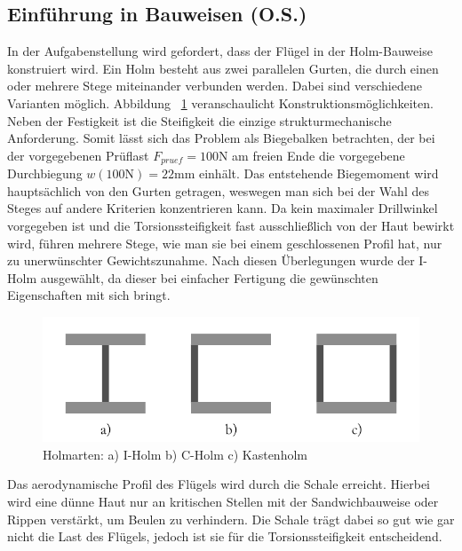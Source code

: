 \newpage
\subsection{Einführung in Bauweisen (O.S.)}
In der Aufgabenstellung wird gefordert, dass der Flügel in der Holm-Bauweise konstruiert wird. Ein Holm besteht aus zwei parallelen Gurten, die durch einen oder mehrere Stege miteinander verbunden werden. Dabei sind verschiedene Varianten möglich. Abbildung ~\ref{fig: Holmarten} veranschaulicht Konstruktionsmöglichkeiten. Neben der Festigkeit ist die Steifigkeit die einzige strukturmechanische Anforderung. Somit lässt sich das Problem als Biegebalken betrachten, der bei der vorgegebenen Prüflast $ F_{pruef}=100\mathrm{N} $ am freien Ende die vorgegebene Durchbiegung $ w(100\mathrm{N})=22\mathrm{mm} $ einhält. Das entstehende Biegemoment wird hauptsächlich von den Gurten getragen, weswegen man sich bei der Wahl des Steges auf andere Kriterien konzentrieren kann. Da kein maximaler Drillwinkel vorgegeben ist und die Torsionssteifigkeit fast ausschließlich von der Haut bewirkt wird, führen mehrere Stege, wie man sie bei einem geschlossenen Profil hat, nur zu unerwünschter Gewichtszunahme. Nach diesen Überlegungen wurde der I-Holm ausgewählt, da dieser bei einfacher Fertigung die gewünschten Eigenschaften mit sich bringt.
\begin{figure}[h]
	\includegraphics[width=1.0\textwidth]{Bilder/Holmarten.png}
	\caption{Holmarten: a) I-Holm   b) C-Holm    c) Kastenholm}
	\label{fig: Holmarten}
\end{figure} 

\noindent
Das aerodynamische Profil des Flügels wird durch die Schale erreicht. Hierbei wird eine dünne Haut nur an kritischen Stellen mit der Sandwichbauweise oder Rippen verstärkt, um Beulen zu verhindern. Die Schale trägt dabei so gut wie gar nicht die Last des Flügels, jedoch ist sie für die Torsionssteifigkeit entscheidend.
\FloatBarrier